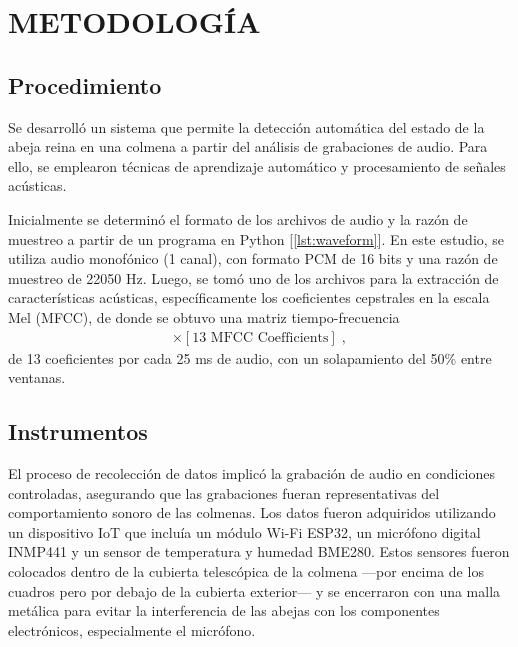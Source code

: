 \documentclass[12pt]{report}
\newenvironment{tightmulticols}{%
  \begin{multicols}{2}
  \setlength{\parskip}{0pt}
  \setlength{\parindent}{0em}
  \linespread{1}\selectfont
}{%
  \end{multicols}
}
\begin{document}
\pagebreak
\chapter{METODOLOGÍA}
\vspace{-3em}

\begin{tightmulticols}

\section{Procedimiento}

\par Se desarrolló un sistema que permite la detección automática del estado de la abeja reina en una colmena a partir del análisis de grabaciones de audio. Para ello, se emplearon técnicas de aprendizaje automático y procesamiento de señales acústicas.

\par Inicialmente se determinó el formato de los archivos de audio y la razón de muestreo a partir de un programa en Python [\ref{lst:waveform}]. En este estudio, se utiliza audio monofónico (1 canal), con formato PCM de 16 bits y una razón de muestreo de 22050 Hz. Luego, se tomó uno de los archivos para la extracción de características acústicas, específicamente los coeficientes cepstrales en la escala Mel (MFCC), de donde se obtuvo una matriz tiempo-frecuencia
\begin{align*}
[\text{Time Frames}] \times [\text{13 MFCC Coefficients}] \; ,
\end{align*}
de 13 coeficientes por cada 25 ms de audio, con un solapamiento del 50\% entre ventanas.

\section{Instrumentos}

\par El proceso de recolección de datos implicó la grabación de audio en condiciones controladas, asegurando que las grabaciones fueran representativas del comportamiento sonoro de las colmenas. Los datos fueron adquiridos utilizando un dispositivo IoT que incluía un módulo Wi-Fi ESP32, un micrófono digital INMP441 y un sensor de temperatura y humedad BME280. Estos sensores fueron colocados dentro de la cubierta telescópica de la colmena —por encima de los cuadros pero por debajo de la cubierta exterior— y se encerraron con una malla metálica para evitar la interferencia de las abejas con los componentes electrónicos, especialmente el micrófono.


\end{tightmulticols}
\end{document}
